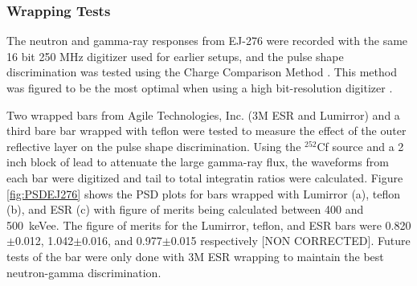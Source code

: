 \subsubsection{Wrapping Tests}
 The neutron and gamma-ray responses from EJ-276 were recorded with the same 16 bit 250 MHz digitizer used for earlier setups, and the pulse shape discrimination was tested using the Charge Comparison Method \cite{CCMPSD}. This method was figured to be the most optimal when using a high bit-resolution digitizer \cite{HighResPSD}.

 \begin{comment}
   \begin{figure*}[hbt]
 \centering
  \texttt{[image: Figures/PSDWrappingComparison.eps]}
  \caption{Two dimensional histograms of the CCM PSD of three different types of wrapping. [NON CORRECTED]}
  \label{fig:PSDEJ276}
\end{figure*}
\end{comment}

Two wrapped bars from Agile Technologies, Inc. (3M\textsuperscript{\texttrademark} ESR and Lumirror\textsuperscript{\texttrademark}) and a third bare bar wrapped with teflon were tested to measure the effect of the outer reflective layer on the pulse shape discrimination. Using the $^{252}$Cf source and a 2 inch block of lead to attenuate the large gamma-ray flux, the waveforms from each bar were digitized and tail to total integratin ratios were calculated. Figure \ref{fig:PSDEJ276} shows the PSD plots for bars wrapped with Lumirror\textsuperscript{\texttrademark} (a), teflon (b), and ESR (c) with figure of merits being calculated between 400 and 500~keVee. The figure of merits for the Lumirror\textsuperscript{\texttrademark}, teflon, and ESR bars were 0.820$\pm$0.012, 1.042$\pm$0.016, and 0.977$\pm$0.015 respectively [NON CORRECTED]. Future tests of the bar were only done with 3M\textsuperscript{\texttrademark} ESR wrapping to maintain the best neutron-gamma discrimination.

